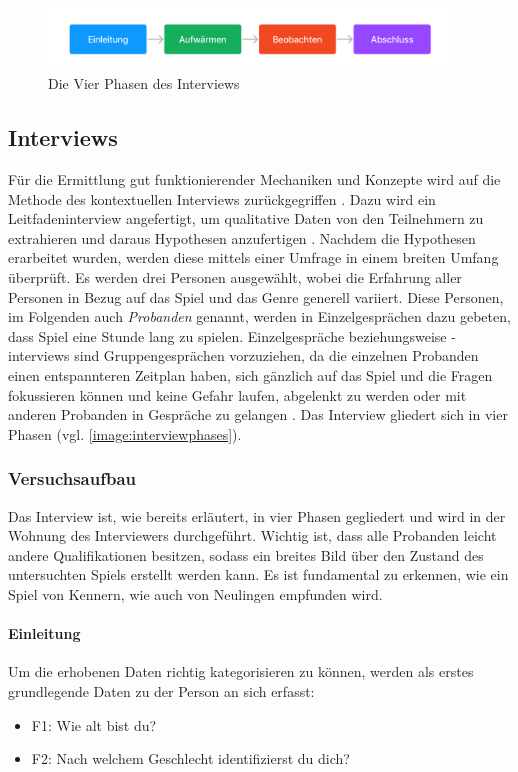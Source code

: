 
\begin{figure}
    \begin{center}
        \includegraphics[width=400px]{0.bilder/interviewphases.png}
    \end{center}
    \caption{Die Vier Phasen des Interviews} \label{image:interviewphases}
\end{figure}
\subsection{Interviews}
Für die Ermittlung gut funktionierender Mechaniken und Konzepte wird auf die Methode des kontextuellen Interviews zurückgegriffen \cite*[]{holtzblatt_beyer_1997}. Dazu wird ein Leitfadeninterview angefertigt, um qualitative Daten von den Teilnehmern zu extrahieren und daraus Hypothesen anzufertigen \cite*[]{baur_blasius}. Nachdem die Hypothesen erarbeitet wurden, werden diese mittels einer Umfrage in einem breiten Umfang überprüft. Es werden drei Personen ausgewählt, wobei die Erfahrung aller Personen in Bezug auf das Spiel und das Genre generell variiert. Diese Personen, im Folgenden auch \textit{Probanden} genannt, werden in Einzelgesprächen dazu gebeten, dass Spiel eine Stunde lang zu spielen. Einzelgespräche beziehungsweise -interviews sind Gruppengesprächen vorzuziehen, da die einzelnen Probanden einen entspannteren Zeitplan haben, sich gänzlich auf das Spiel und die Fragen fokussieren können und keine Gefahr laufen, abgelenkt zu werden oder mit anderen Probanden in Gespräche zu gelangen \cite*[]{lankoski_bjork}. Das Interview gliedert sich in vier Phasen (vgl. \autoref{image:interviewphases}).

\subsubsection{Versuchsaufbau}
Das Interview ist, wie bereits erläutert, in vier Phasen gegliedert und wird in der Wohnung des Interviewers durchgeführt. Wichtig ist, dass alle Probanden leicht andere Qualifikationen besitzen, sodass ein breites Bild über den Zustand des untersuchten Spiels erstellt werden kann. Es ist fundamental zu erkennen, wie ein Spiel von Kennern, wie auch von Neulingen empfunden wird.
 
\paragraph {Einleitung}
Um die erhobenen Daten richtig kategorisieren zu können, werden als erstes grundlegende Daten zu der Person an sich erfasst:
\begin{itemize}
    \item F1: Wie alt bist du?
    \item F2: Nach welchem Geschlecht identifizierst du dich?
\end{itemize}

